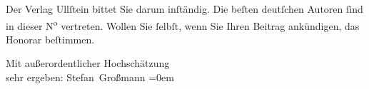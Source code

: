 \pstart
           Der Verlag Ullſtein bittet Sie darum inſtändig.
               Die beſten deutſchen Autoren{ }ſind in dieser N\textsuperscript{o} vertreten.
               Wollen Sie{ }ſelbſt, wenn Sie Ihren Beitrag ankündigen, das Honorar beſtimmen.\pend
           
\pstart
           Mit außerordentlicher Hochschätzung{\\[\baselineskip]}sehr ergeben: \spacefill\mbox{Stefan
                  Großmann}\pend
           \leftskip=0em{}\endnumbering{}  \newcommand{\dateiname}{L02158}\newcommand{\titel}{Stefan Großmann an Arthur Schnitzler, 30. 11. 1913}\newcommand{\editorInnen}{Martin Anton Müller und Gerd-Hermann Susen}

